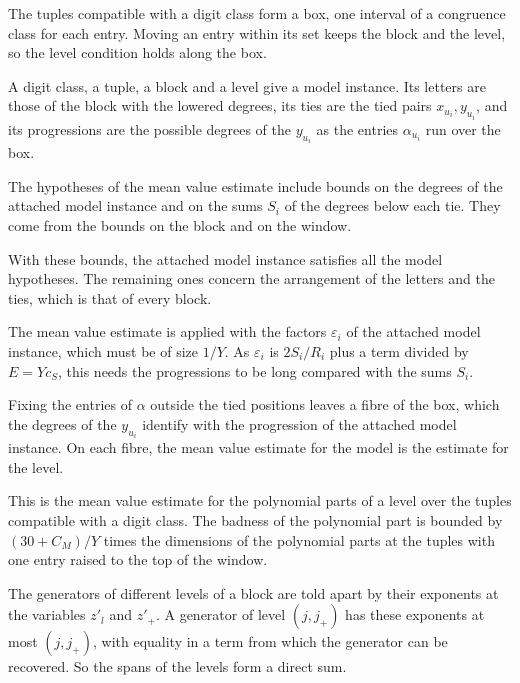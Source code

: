 The tuples compatible with a digit class form a box, one interval of a congruence class for each entry.
Moving an entry within its set keeps the block and the level, so the level condition holds along the box.

A digit class, a tuple, a block and a level give a model instance. Its letters are those of the block with
the lowered degrees, its ties are the tied pairs $x_{u_i},y_{u_i}$, and its progressions are the possible
degrees of the $y_{u_i}$ as the entries $\alpha_{u_i}$ run over the box.

The hypotheses of the mean value estimate include bounds on the degrees of the attached model instance and
on the sums $S_i$ of the degrees below each tie. They come from the bounds on the block and on the window.

With these bounds, the attached model instance satisfies all the model hypotheses. The remaining ones
concern the arrangement of the letters and the ties, which is that of every block.

The mean value estimate is applied with the factors $\varepsilon_i$ of the attached model instance, which
must be of size $1/Y$. As $\varepsilon_i$ is $2S_i/R_i$ plus a term divided by $E=Yc_S$, this needs the
progressions to be long compared with the sums $S_i$.

Fixing the entries of $\alpha$ outside the tied positions leaves a fibre of the box, which the degrees of
the $y_{u_i}$ identify with the progression of the attached model instance. On each fibre, the mean value
estimate for the model is the estimate for the level.

This is the mean value estimate for the polynomial parts of a level over the tuples compatible with a
digit class. The badness of the polynomial part is bounded by $(30+C_M)/Y$ times the dimensions of the
polynomial parts at the tuples with one entry raised to the top of the window.

The generators of different levels of a block are told apart by their exponents at the variables $z'_l$
and $z'_+$. A generator of level $(j,j_+)$ has these exponents at most $(j,j_+)$, with equality in a term
from which the generator can be recovered. So the spans of the levels form a direct sum.

